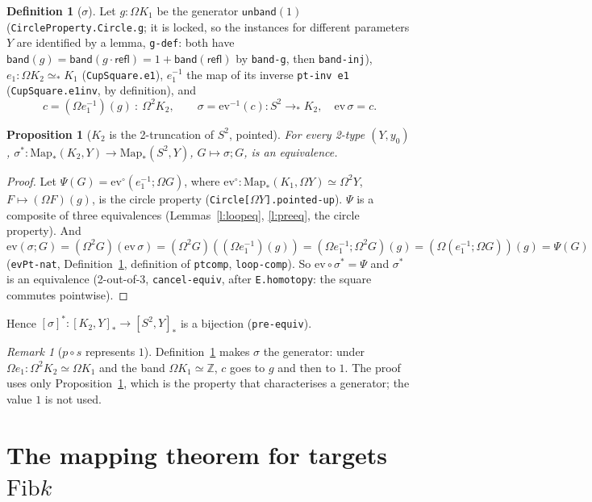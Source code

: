 \documentclass[11pt]{amsart}
\newtheorem{proposition}[theorem]{Proposition}
\theoremstyle{definition}
\newtheorem{definition}[theorem]{Definition}
\theoremstyle{remark}
\newtheorem{remark}[theorem]{Remark}
\newcommand{\Om}{\Omega}
\newcommand{\Map}{\mathrm{Map}_*}
\newcommand{\Z}{\mathbb{Z}}
\newcommand{\code}[1]{\texttt{#1}}
\newcommand{\refl}{\mathsf{refl}}
\newcommand{\hc}[2]{[#1,#2]_*}
\newcommand{\Fib}{\mathrm{Fib}}
\newcommand{\cls}[1]{[#1]}
\begin{document}
\begin{definition}[$\sigma$]\label{d:sigma}
Let $g:\Om K_1$ be the generator $\mathsf{unband}(1)$
(\code{CircleProperty.Circle.g}; it is locked, so the instances for
different parameters $Y$ are identified by a lemma, \code{g-def}: both
have $\mathsf{band}(g)=\mathsf{band}(g\cdot\refl)=1+\mathsf{band}(\refl)$
by \code{band-g}, then \code{band-inj}), $e_1:\Om K_2\simeq_*K_1$
(\code{CupSquare.e1}), $e_1^{-1}$ the map of its inverse \code{pt-inv e1}
(\code{CupSquare.e1inv}, by definition), and
\[c=(\Om e_1^{-1})(g)\ :\ \Om^2K_2,\qquad \sigma=\mathrm{ev}^{-1}(c):S^2\to_*K_2,\quad \mathrm{ev}\,\sigma=c .\]
\end{definition}

\begin{proposition}[$K_2$ is the 2-truncation of $S^2$, pointed]\label{p:sigma}
For every 2-type $(Y,y_0)$, $\sigma^*:\Map(K_2,Y)\to\Map(S^2,Y)$,
$G\mapsto\sigma;G$, is an equivalence.
\end{proposition}
\begin{proof}
Let $\Psi(G)=\mathrm{ev}^{\circ}(e_1^{-1};\Om G)$, where
$\mathrm{ev}^{\circ}:\Map(K_1,\Om Y)\simeq\Om^2Y$, $F\mapsto(\Om F)(g)$,
is the circle property (\code{Circle[$\Om Y$].pointed-up}). $\Psi$ is a
composite of three equivalences (Lemmas~\ref{l:loopeq}, \ref{l:preeq},
the circle property). And
\[\mathrm{ev}(\sigma;G)=(\Om^2G)(\mathrm{ev}\,\sigma)=(\Om^2G)((\Om e_1^{-1})(g))
=(\Om e_1^{-1};\Om^2G)(g)=(\Om(e_1^{-1};\Om G))(g)=\Psi(G)\]
(\code{evPt-nat}, Definition~\ref{d:sigma}, definition of \code{ptcomp},
\code{loop-comp}). So $\mathrm{ev}\circ\sigma^*=\Psi$ and $\sigma^*$ is an
equivalence (2-out-of-3, \code{cancel-equiv}, after \code{E.homotopy}:
the square commutes pointwise).
\end{proof}
Hence $\cls\sigma^*:\hc{K_2}Y\to\hc{S^2}Y$ is a bijection
(\code{pre-equiv}).

\begin{remark}[$p\circ s$ represents $1$]
Definition~\ref{d:sigma} makes $\sigma$ the generator: under
$\Om e_1:\Om^2K_2\simeq\Om K_1$ and the band $\Om K_1\simeq\Z$, $c$ goes
to $g$ and then to $1$. The proof uses only Proposition~\ref{p:sigma},
which is the property that characterises a generator; the value $1$ is not
used.
\end{remark}

\section{The mapping theorem for targets $\Fib k$}
\end{document}
